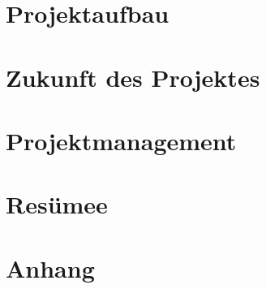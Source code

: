 \documentclass[12pt]{report}
\begin{document}
    \chapter{Projektaufbau}
    

    \chapter{Zukunft des Projektes}
    

    \chapter{Projektmanagement}
    

    \chapter{Resümee}
    

    \chapter{Anhang}
    
    
\end{document}
